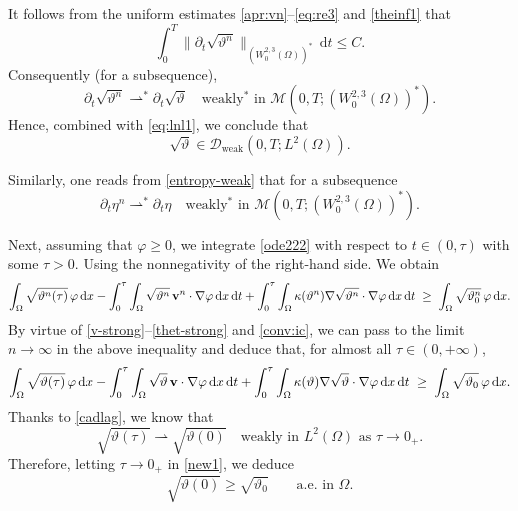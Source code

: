 \documentclass[11pt, a4paper, reqno]{amsart}
\numberwithin{equation}{section}
\newcommand{\vc}[1]{{\bf #1}}
\newcommand{\vv}{\vc{v}}
\newcommand{\thet}{\vartheta}
\newcommand{\dt}{\,{\rm d} t }
\newcommand{\dx}{\,{\rm d} {x}}
\newcommand{\dxdt}{\dx  \dt}
\newcommand{\intO}[1]{\int_{\Omega} #1 \dx}
\newcommand{\inttO}[1]{\int_0^{\tau} \int_{\Omega} #1 \dxdt}
\begin{document}
It follows from the uniform estimates \eqref{apr:vn}--\eqref{eq:re3} and \eqref{theinf1} that
$$
\int_0^T \big\|\partial_t \sqrt{\vartheta^n}\big\|_{(W^{2,3}_0(\Omega))^*}\,\mathrm{d}t \le C.
$$
Consequently (for a subsequence),
$$
\partial_t \sqrt{\vartheta^n} \rightharpoonup^* \partial_t \sqrt{\vartheta} 
\quad\text{weakly$^*$ in } \mathcal{M}(0,T;  (W^{2,3}_0(\Omega))^*).
$$
Hence, combined with \eqref{eq:lnl1}, we conclude that
\begin{equation}\label{cadlag}
\sqrt{\vartheta} \in \mathcal{D}_{\textrm{weak}}(0,T; L^2(\Omega)).
\end{equation}

Similarly, one reads from \eqref{entropy-weak} that for a subsequence
$$
\partial_t {\eta^n} \rightharpoonup^* \partial_t \eta 
\quad\text{weakly$^*$ in } \mathcal{M}(0,T;  (W^{2,3}_0(\Omega))^*).
$$


Next, assuming that $\varphi \geq 0$, we integrate \eqref{ode222} with respect to 
$t \in (0,\tau)$ with some $\tau>0$. Using the nonnegativity of the right-hand side. We obtain
$$
\intO{\sqrt{\vartheta^n(\tau)}\,\varphi}
- \inttO{\sqrt{\vartheta^n}\,\vv^n \cdot \nabla \varphi} 
+ \inttO{\kappa(\vartheta^n)\nabla\sqrt{\vartheta^n}\cdot \nabla \varphi}
\;\geq\;\intO{\sqrt{\vartheta^n_0}\,\varphi}.
$$
By virtue of \eqref{v-strong}--\eqref{thet-strong} and \eqref{conv:ic}, 
we can pass to the limit $n\to\infty$ in the above inequality and deduce that, 
for almost all $\tau \in (0,+\infty)$,
\begin{equation}\label{new1}
\intO{\sqrt{\vartheta(\tau)}\,\varphi}
- \inttO{\sqrt{\vartheta}\,\vv \cdot \nabla \varphi} 
+ \inttO{\kappa(\vartheta)\nabla\sqrt{\vartheta}\cdot \nabla \varphi}
\;\geq\;\intO{\sqrt{\vartheta_0}\,\varphi}.
\end{equation}
Thanks to \eqref{cadlag}, we know that 
\begin{equation}\label{weakonly}
\sqrt{\vartheta(\tau)} \rightharpoonup \sqrt{\vartheta(0)} 
\quad \text{weakly in } L^2(\Omega) \text{ as } \tau \to 0_+.
\end{equation}
Therefore, letting $\tau \to 0_+$ in \eqref{new1}, we deduce
\begin{equation}\label{eq:thet-liminf}
 \sqrt{\vartheta(0)} \geq \sqrt{\vartheta_0}
 \qquad \text{a.e. in } \Omega.
\end{equation}

\end{document}

